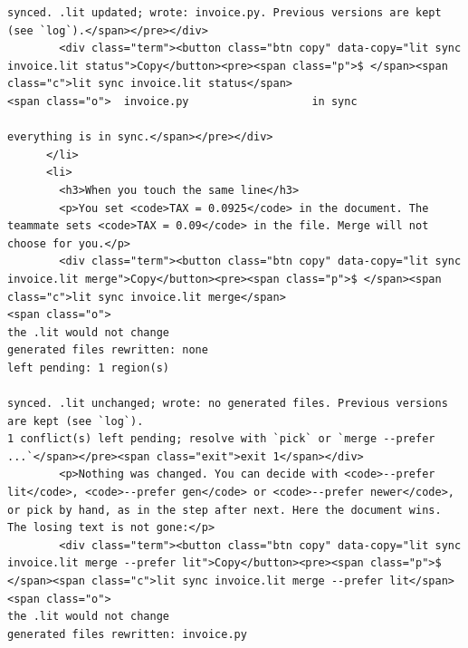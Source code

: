 \documentclass[10pt,a4paper]{article}
\begin{document}
\begin{Verbatim}
synced. .lit updated; wrote: invoice.py. Previous versions are kept (see `log`).</span></pre></div>
        <div class="term"><button class="btn copy" data-copy="lit sync invoice.lit status">Copy</button><pre><span class="p">$ </span><span class="c">lit sync invoice.lit status</span>
<span class="o">  invoice.py                   in sync

everything is in sync.</span></pre></div>
      </li>
      <li>
        <h3>When you touch the same line</h3>
        <p>You set <code>TAX = 0.0925</code> in the document. The teammate sets <code>TAX = 0.09</code> in the file. Merge will not choose for you.</p>
        <div class="term"><button class="btn copy" data-copy="lit sync invoice.lit merge">Copy</button><pre><span class="p">$ </span><span class="c">lit sync invoice.lit merge</span>
<span class="o">
the .lit would not change
generated files rewritten: none
left pending: 1 region(s)

synced. .lit unchanged; wrote: no generated files. Previous versions are kept (see `log`).
1 conflict(s) left pending; resolve with `pick` or `merge --prefer ...`</span></pre><span class="exit">exit 1</span></div>
        <p>Nothing was changed. You can decide with <code>--prefer lit</code>, <code>--prefer gen</code> or <code>--prefer newer</code>, or pick by hand, as in the step after next. Here the document wins. The losing text is not gone:</p>
        <div class="term"><button class="btn copy" data-copy="lit sync invoice.lit merge --prefer lit">Copy</button><pre><span class="p">$ </span><span class="c">lit sync invoice.lit merge --prefer lit</span>
<span class="o">
the .lit would not change
generated files rewritten: invoice.py


\end{Verbatim}
\end{document}
